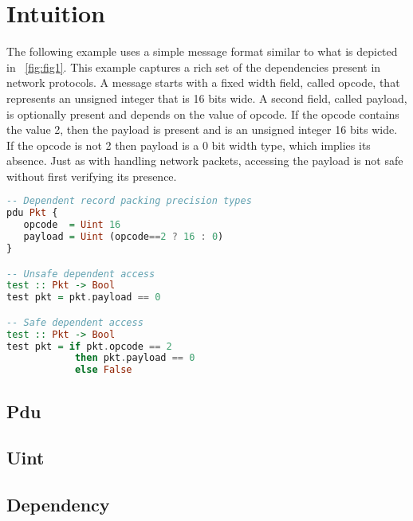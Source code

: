 \section{Intuition}

The following example uses a simple message format similar to what is depicted
in ~\ref{fig:fig1}. This example captures a rich set of the dependencies present
in network protocols. A message starts with a fixed width field, called opcode,
that represents an unsigned integer that is 16 bits wide. A second field, called
payload, is optionally present and depends on the value of opcode. If the opcode
contains the value 2, then the payload is present and is an unsigned integer 16
bits wide. If the opcode is not 2 then payload is a 0 bit width type, which 
implies its absence. Just as with handling network packets, accessing the 
payload is not safe without first verifying its presence.

\begin{lstlisting}[language=Haskell]
-- Dependent record packing precision types
pdu Pkt {
   opcode  = Uint 16
   payload = Uint (opcode==2 ? 16 : 0)
}

-- Unsafe dependent access
test :: Pkt -> Bool
test pkt = pkt.payload == 0

-- Safe dependent access
test :: Pkt -> Bool
test pkt = if pkt.opcode == 2 
            then pkt.payload == 0 
            else False
\end{lstlisting}

\subsection{Pdu}



\subsection{Uint}

\subsection{Dependency}

